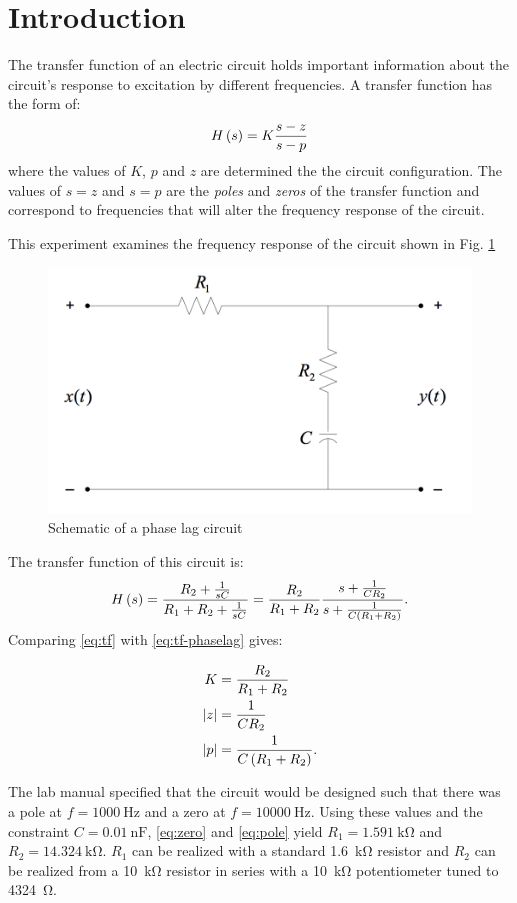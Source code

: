 \section{Introduction}\label{sec:intro}
The transfer function of an electric circuit holds important information about the circuit's response to excitation by different frequencies.
A transfer function has the form of:
\begin{equation}\label{eq:tf}
	H \left( s \right) = K { s - z \over s - p }
\end{equation}
where the values of $K$, $p$ and $z$ are determined the the circuit configuration.
The values of $s = z$ and $s = p$ are the \textit{poles} and \textit{zeros} of the transfer function and correspond to frequencies that will alter the frequency response of the circuit.

This experiment examines the frequency response of the circuit shown in Fig. \ref{fig:schematic}

\begin{figure}[tbph]
\centering
\includegraphics[width=0.7\linewidth]{graphics/lag-schematic}
\caption{Schematic of a phase lag circuit}
\label{fig:schematic}
\end{figure}

The transfer function of this circuit is:
\begin{equation}\label{eq:tf-phaselag}
H \left( s \right) = { R_2 + \frac{1}{sC} \over R_1 + R_2 + \frac{1}{sC}} = {R_2 \over R_1 + R_2 } { s + \frac{1}{C R_2} \over s + \frac{1}{C \left( R_1 + R_2 \right)} }.
\end{equation}
Comparing \eqref{eq:tf} with \eqref{eq:tf-phaselag} gives:

\begin{align}
K &= {R_2 \over R_1 + R_2 } \nonumber \\
\left|z\right| &= \frac{1}{C R_2} \label{eq:zero}\\
\left|p\right| &= \frac{1}{C \left( R_1 + R_2 \right)}. \label{eq:pole}
\end{align}

The lab manual specified that the circuit would be designed such that there was a pole at $f = \SI{1000}{\hertz}$  and a zero at $f = \SI{10000}{\hertz}$.
Using these values and the constraint $C = \SI{0.01}{\nano\farad}$, \eqref{eq:zero} and \eqref{eq:pole} yield $R_1 = \SI{1.591}{\kilo\ohm}$ and $R_2 = \SI{14.324}{\kilo\ohm}$.
$R_1$ can be realized with a standard \SI{1.6}{\kilo\ohm} resistor and $R_2$ can be realized from a \SI{10}{\kilo\ohm} resistor in series with a \SI{10}{\kilo\ohm} potentiometer tuned to \SI{4324}{\ohm}.
